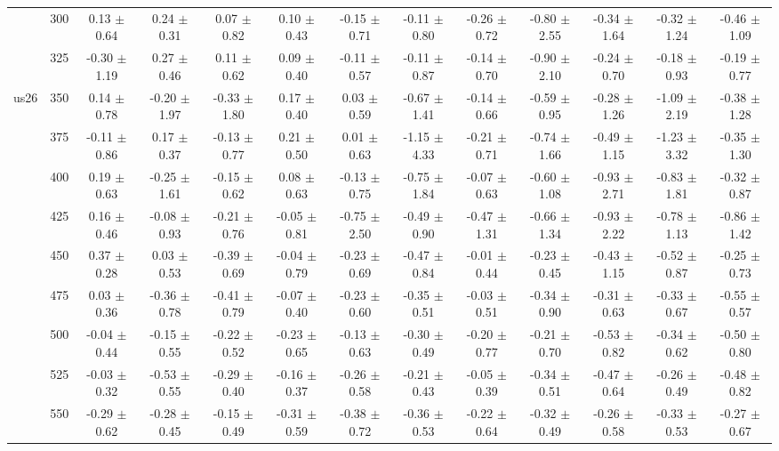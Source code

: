 \begin{table}[h]
{\begin{tabular}{
        ccccccccccccc}
 & 300& 0.13 $\pm$ 0.64& 0.24 $\pm$ 0.31& 0.07 $\pm$ 0.82& 0.10 $\pm$ 0.43& -0.15 $\pm$ 0.71& -0.11 $\pm$ 0.80& -0.26 $\pm$ 0.72& -0.80 $\pm$ 2.55& -0.34 $\pm$ 1.64& -0.32 $\pm$ 1.24& -0.46 $\pm$ 1.09 \\ 
 & 325& -0.30 $\pm$ 1.19& 0.27 $\pm$ 0.46& 0.11 $\pm$ 0.62& 0.09 $\pm$ 0.40& -0.11 $\pm$ 0.57& -0.11 $\pm$ 0.87& -0.14 $\pm$ 0.70& -0.90 $\pm$ 2.10& -0.24 $\pm$ 0.70& -0.18 $\pm$ 0.93& -0.19 $\pm$ 0.77 \\ 
\multirow{4}{*}{us26}& 350& 0.14 $\pm$ 0.78& -0.20 $\pm$ 1.97& -0.33 $\pm$ 1.80& 0.17 $\pm$ 0.40& 0.03 $\pm$ 0.59& -0.67 $\pm$ 1.41& -0.14 $\pm$ 0.66& -0.59 $\pm$ 0.95& -0.28 $\pm$ 1.26& -1.09 $\pm$ 2.19& -0.38 $\pm$ 1.28 \\ 
 & 375& -0.11 $\pm$ 0.86& 0.17 $\pm$ 0.37& -0.13 $\pm$ 0.77& 0.21 $\pm$ 0.50& 0.01 $\pm$ 0.63& -1.15 $\pm$ 4.33& -0.21 $\pm$ 0.71& -0.74 $\pm$ 1.66& -0.49 $\pm$ 1.15& -1.23 $\pm$ 3.32& -0.35 $\pm$ 1.30 \\ 
 & 400& 0.19 $\pm$ 0.63& -0.25 $\pm$ 1.61& -0.15 $\pm$ 0.62& 0.08 $\pm$ 0.63& -0.13 $\pm$ 0.75& -0.75 $\pm$ 1.84& -0.07 $\pm$ 0.63& -0.60 $\pm$ 1.08& -0.93 $\pm$ 2.71& -0.83 $\pm$ 1.81& -0.32 $\pm$ 0.87 \\ 
 & 425& 0.16 $\pm$ 0.46& -0.08 $\pm$ 0.93& -0.21 $\pm$ 0.76& -0.05 $\pm$ 0.81& -0.75 $\pm$ 2.50& -0.49 $\pm$ 0.90& -0.47 $\pm$ 1.31& -0.66 $\pm$ 1.34& -0.93 $\pm$ 2.22& -0.78 $\pm$ 1.13& -0.86 $\pm$ 1.42 \\ 
 & 450& 0.37 $\pm$ 0.28& 0.03 $\pm$ 0.53& -0.39 $\pm$ 0.69& -0.04 $\pm$ 0.79& -0.23 $\pm$ 0.69& -0.47 $\pm$ 0.84& -0.01 $\pm$ 0.44& -0.23 $\pm$ 0.45& -0.43 $\pm$ 1.15& -0.52 $\pm$ 0.87& -0.25 $\pm$ 0.73 \\ 
 & 475& 0.03 $\pm$ 0.36& -0.36 $\pm$ 0.78& -0.41 $\pm$ 0.79& -0.07 $\pm$ 0.40& -0.23 $\pm$ 0.60& -0.35 $\pm$ 0.51& -0.03 $\pm$ 0.51& -0.34 $\pm$ 0.90& -0.31 $\pm$ 0.63& -0.33 $\pm$ 0.67& -0.55 $\pm$ 0.57 \\ 
 & 500& -0.04 $\pm$ 0.44& -0.15 $\pm$ 0.55& -0.22 $\pm$ 0.52& -0.23 $\pm$ 0.65& -0.13 $\pm$ 0.63& -0.30 $\pm$ 0.49& -0.20 $\pm$ 0.77& -0.21 $\pm$ 0.70& -0.53 $\pm$ 0.82& -0.34 $\pm$ 0.62& -0.50 $\pm$ 0.80 \\ 
 & 525& -0.03 $\pm$ 0.32& -0.53 $\pm$ 0.55& -0.29 $\pm$ 0.40& -0.16 $\pm$ 0.37& -0.26 $\pm$ 0.58& -0.21 $\pm$ 0.43& -0.05 $\pm$ 0.39& -0.34 $\pm$ 0.51& -0.47 $\pm$ 0.64& -0.26 $\pm$ 0.49& -0.48 $\pm$ 0.82 \\ 
 & 550& -0.29 $\pm$ 0.62& -0.28 $\pm$ 0.45& -0.15 $\pm$ 0.49& -0.31 $\pm$ 0.59& -0.38 $\pm$ 0.72& -0.36 $\pm$ 0.53& -0.22 $\pm$ 0.64& -0.32 $\pm$ 0.49& -0.26 $\pm$ 0.58& -0.33 $\pm$ 0.53& -0.27 $\pm$ 0.67 \\ 

\end{tabular}}
\end{table}
